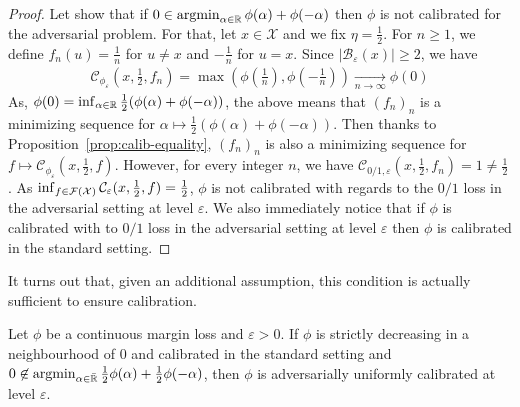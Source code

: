 \begin{proof}

    Let show that if $0\in\operatorname*{argmin}_{\alpha\in\mathbb{R}} \phi(\alpha)+\phi(-\alpha)$ then $\phi$ is not calibrated for the adversarial problem. For that, let $x\in\mathcal{X}$ and we fix $\eta = \frac12$.  For $n\geq1$, we define $f_n(u) = \frac1n$ for $u\neq x$ and $-\frac{1}{n}$ for $u=x$.  Since $\lvert\mathcal{B}_\varepsilon(x)\rvert\geq 2$, we have
    \begin{align*}
         \mathcal{C}_{\phi_\varepsilon}(x,\frac12,f_n) = \max\left(\phi(\frac1n),\phi(-\frac1n)\right)\xrightarrow[n\to\infty]{} \phi(0) %
    \end{align*}
    As, $\phi(0) = \inf_{\alpha\in\RR}\frac12\left(\phi(\alpha)+\phi(-\alpha)\right)$, the above means that $(f_n)_n$ is a minimizing sequence for $\alpha \mapsto \frac12 \left(\phi(\alpha)+\phi(-\alpha)\right)$. 
    Then thanks to Proposition~\ref{prop:calib-equality}, $(f_n)_n$ is also a minimizing sequence for $f \mapsto\mathcal{C}_{\phi_\varepsilon}(x,\frac12,f)$. However, for every integer $n$, we have $\mathcal{C}_{0/1,\varepsilon}(x,\frac12,f_n) =1\neq\frac12$. As  $\inf_{f\in\mathcal{F}(\mathcal{X})}\mathcal{C}_{\varepsilon}(x,\frac12,f)=\frac12$, $\phi$ is not calibrated with regards to the $0/1$ loss in the adversarial setting at level $\varepsilon$. We also immediately notice that if $\phi$ is  calibrated with to  $0/1$ loss in the adversarial setting at level $\varepsilon$ then $\phi$ is calibrated in the standard setting. 
    
    
\end{proof}



It turns out that, given an additional assumption, this condition is actually sufficient to ensure calibration.


\begin{thm} 
\label{thm:calibration-suf}
Let $\phi$  be a continuous margin loss and $\varepsilon>0$. If $\phi$ is strictly decreasing in a neighbourhood of $0$ and calibrated in the standard setting and $0\not\in \operatorname*{argmin}_{\alpha\in\bar{\mathbb{R}}}
\frac12\phi(\alpha)+\frac12\phi(-\alpha)$, then $\phi$ is adversarially uniformly calibrated at level $\varepsilon$.
\end{thm}


